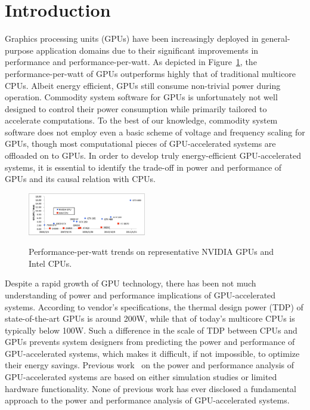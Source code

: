 \section{Introduction}

Graphics processing units (GPUs) have been increasingly deployed in
general-purpose application domains due to their significant
improvements in performance and performance-per-watt.
As depicted in Figure~\ref{fig:perf_per_watt}, the performance-per-watt
of GPUs outperforms highly that of traditional multicore CPUs.
Albeit energy efficient, GPUs still consume non-trivial power during
operation.
Commodity system software for GPUs is unfortunately not well designed to
control their power consumption while primarily tailored to accelerate
computations.
To the best of our knowledge, commodity system software does not employ
even a basic scheme of voltage and frequency scaling for GPUs, though
most computational pieces of GPU-accelerated systems are offloaded on to
GPUs.
In order to develop truly energy-efficient GPU-accelerated systems, it
is essential to identify the trade-off in power and performance 
of GPUs and its causal relation with CPUs.

\begin{figure}[!t]
\centering
 \includegraphics[width=0.46\textwidth]{figures/perf_per_watt.pdf}
 \label{fig:perf_per_watt}
 \caption{Performance-per-watt trends on representative NVIDIA GPUs and
 Intel CPUs.}
\end{figure}

Despite a rapid growth of GPU technology, there has been not much
understanding of power and performance implications of GPU-accelerated
systems.
According to vendor's specifications, the thermal design power (TDP) of
state-of-the-art GPUs is around 200W, while that of today's multicore
CPUs is typically below 100W.
Such a difference in the scale of TDP between CPUs and GPUs prevents
system designers from predicting the power and performance of
GPU-accelerated systems, which makes it difficult, if not impossible, to
optimize their energy savings.
Previous work~\cite{Hong2009,Hong2010,Jiao2010,Lee2011,Nagasaka2010} on
the power and performance analysis of GPU-accelerated systems are based
on either simulation studies or limited hardware functionality.
None of previous work has ever disclosed a fundamental approach to the
power and performance analysis of GPU-accelerated systems.

